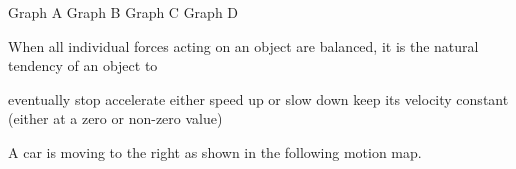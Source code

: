 \documentclass[]{exam}
\begin{document}
\begin{questions}
\begin{randomizeoneparchoices}[norandomize]
    \choice Graph A
    \choice Graph B
    \correctchoice Graph C
    \choice Graph D
\end{randomizeoneparchoices}





\question 
When all individual forces acting on an object are balanced, it is the natural tendency of an object to 

\begin{randomizechoices}[norandomize]
    \choice eventually stop
    \choice accelerate
    \choice either speed up or slow down
    \correctchoice keep its velocity constant (either at a zero or non-zero value)
\end{randomizechoices}

\question 
A car is moving to the right as shown in the following motion map. 

\begin{center}
\end{center}


\end{questions}
\end{document}
